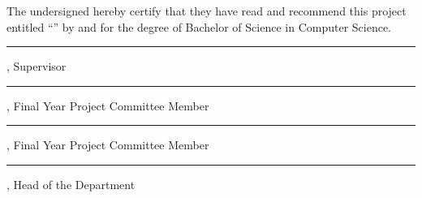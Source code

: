 \vspace*{34.7pt}

The undersigned hereby certify that they have read and recommend this project
\mbox{entitled} ``\textbf{\ReportTitle}'' by \textbf{\ReportStudent} and
\textbf{\ReportStudentTwo} for the degree of Bachelor of Science in Computer
Science.

\vspace{63.6pt}

\rule{2.65in}{0.4pt}\par
\ReportSupervisor, Supervisor

\vspace{50.2pt}

\rule{2.65in}{0.4pt}\par
\ReportCommitteeMemberOne, Final Year Project Committee Member

\vspace{50.2pt}

\rule{2.65in}{0.4pt}\par
\ReportCommitteeMemberTwo, Final Year Project Committee Member

\vspace{56.8pt}

\rule{2.65in}{0.4pt}\par
\ReportHeadOfDepartment, Head of the Department

\clearpage
